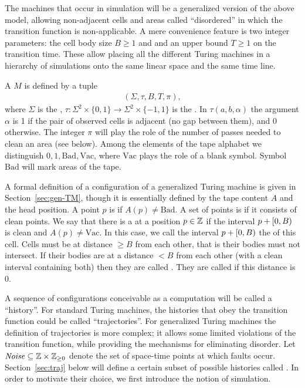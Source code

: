 \documentclass[11pt]{memoir}
\theoremstyle{definition} %
\renewcommand{\ge}{\geq}
\def\B{B}
\newcommand{\Noise}{\mathit{Noise}}
\newcommand{\passno}{\pi}
\newcommand{\Tu}{T}
\newcommand{\Bad}{\mathrm{Bad}}
\newcommand{\Vacant}{\mathrm{Vac}}
\begin{document}
The machines that occur in simulation will be a generalized version of the above model,
allowing non-adjacent cells and areas called ``disordered''
in which the transition function is non-applicable.
A mere convenience feature is two integer parameters:
the cell body size \( \B\ge 1 \) and and an upper bound \( \Tu\ge 1 \) on the transition time.
These allow placing all the different Turing
machines in a hierarchy of simulations onto
the same linear space and the same time line.

\begin{definition}\label{def:gen-TM}
    A  \( M \) is defined by a tuple
        \begin{align}\label{eq:gen-TM}
             (\Sigma, \tau, \B, \Tu, \passno),
       \end{align}
       where \( \Sigma \) is the ,
       \(  \tau: \Sigma^{2}\times\{0,1\}\to \Sigma^{2}\times\{-1,1\}  \)
    is the .
    In  \( \tau(a,b,\alpha) \) the argument \( \alpha \) is 1 if the pair of observed cells is
    adjacent (no gap between them), and 0 otherwise.
The integer \( \passno \) will play the role of the number of passes needed to clean an area (see below).
Among the elements of the tape alphabet
we distinguish \( 0,1,\Bad,\Vacant \), where \( \Vacant \) plays the role of a blank symbol.
Symbol \( \Bad \) will mark  areas of the tape.
\end{definition}

A formal definition of a configuration of a generalized Turing machine is given in
Section~\ref{sec:gen-TM}, though it is essentially defined by the tape content \( A \) and the head
position.
A point \( p \) is  if  \( A(p)\ne\Bad \).
A set of points is  if it consists of clean points.
We say that there is a  at a position \( p\in\mathbb{Z} \) if the interval
\( p+\lint{0}{\B} \) is clean and \( A(p)\ne \Vacant \).
In this case, we call the interval \( p+\lint{0}{\B} \) the  of this cell.
Cells must be at distance \( \ge\B \) from each other, that is their
bodies must not intersect.
If their bodies are at a distance \( <\B \) from each
other (with a clean interval containing both) then they are called .
They are called  if this distance is \( 0 \).

A sequence of configurations conceivable as a computation will be called a ``history''.
For standard Turing machines, 
the histories that obey the transition function could be called ``trajectories''.
For generalized Turing machines the definition of trajectories is more complex; it
allows some limited violations of the transition function, while providing the mechanisms
for eliminating disorder.
Let \(    \Noise\subseteq \bbZ\times\bbZ_{\ge 0} \)
denote the set of space-time points at which faults occur.
Section~\ref{sec:traj} below will define a certain subset of possible histories
called .
In order to motivate their choice, we first introduce the notion of simulation.
\end{document}
